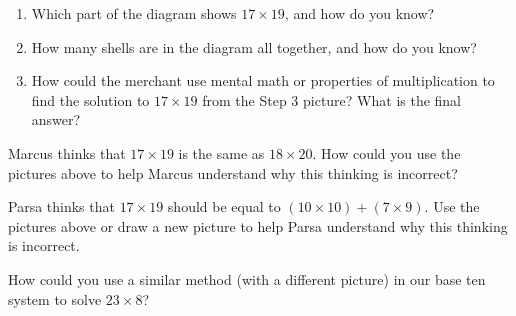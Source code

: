 \documentclass[nooutcomes, noauthor, handout]{ximera}
\begin{document}
\begin{problem}
\begin{enumerate}
	\item Which part of the diagram shows $17 \times 19$, and how do you know?
	\item How many shells are in the diagram all together, and how do you know?
	\item How could the merchant use mental math or properties of multiplication to find the solution to $17 \times 19$ from the Step 3 picture? What is the final answer?
\end{enumerate}
\end{problem}


\begin{problem}
Marcus thinks that $17 \times 19$ is the same as $18 \times 20$. How could you use the pictures above to help Marcus understand why this thinking is incorrect?
\end{problem}


\begin{problem}
Parsa thinks that $17 \times 19$ should be equal to $(10 \times 10) + (7 \times 9)$. Use the pictures above or draw a new picture to help Parsa understand why this thinking is incorrect.
\end{problem}


\begin{problem}
How could you use a similar method (with a different picture) in our base ten system to solve $23 \times 8$?
\end{problem}

\end{document}
